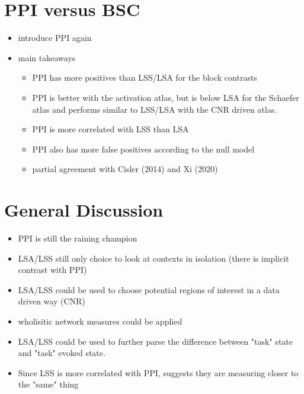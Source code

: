 \documentclass[phd,appendix,figures]{uithesis}
\begin{document}
\chapter{PPI versus BSC}
\begin{itemize}
	\item introduce PPI again
	\item main takeaways
	\begin{itemize}
		\item PPI has more positives than LSS/LSA for the block contrasts
		\item PPI is better with the activation atlas, but is below LSA for the Schaefer atlas
		      and performs similar to LSS/LSA with the CNR driven atlas.
		\item PPI is more correlated with LSS than LSA
		\item PPI also has more false positives according to the null model
		\item partial agreement with Cisler (2014) and Xi (2020) 
	\end{itemize}
\end{itemize}


\chapter{General Discussion}
\begin{itemize}
	\item PPI is still the raining champion
	\item LSA/LSS still only choice to look at contexts in isolation (there is implicit contrast with PPI)
	\item LSA/LSS could be used to choose potential regions of interest in a data driven way (CNR)
	\item wholisitic network measures could be applied
	\item LSA/LSS could be used to further parse the difference between "task" state and "task" evoked state.
	\item Since LSS is more correlated with PPI, suggests they are measuring closer to the "same" thing
\end{itemize}
\appendix
\end{document}
